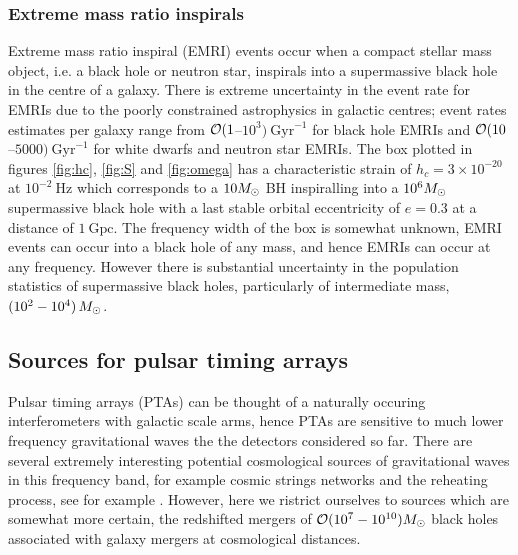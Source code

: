 \subsubsection{Extreme mass ratio inspirals}
Extreme mass ratio inspiral (EMRI) events occur when a compact stellar mass object, i.e. a black hole or neutron star, inspirals into a supermassive black hole in the centre of a galaxy. There is extreme uncertainty in the event rate for EMRIs due to the poorly constrained astrophysics in galactic centres; event rates estimates per galaxy range from ${\cal{O}}(1$--$10^{3})~\textrm{Gyr}^{-1}$ for black hole EMRIs and ${\cal{O}}(10$--$5000)~\textrm{Gyr}^{-1}$ for white dwarfs and neutron star EMRIs. The box plotted in figures \ref{fig:hc}, \ref{fig:S} and \ref{fig:omega} has a characteristic strain of $h_{c}=3\times 10^{-20}$ at $10^{-2}~\textrm{Hz}$ which corresponds to a $10M_{ \odot }$ BH inspiralling into a $10^{6}M_{ \odot }$ supermassive black hole with a last stable orbital eccentricity of $e=0.3$ at a distance of $1~\textrm{Gpc}$. The frequency width of the box is somewhat unknown, EMRI events can occur into a black hole of any mass, and hence EMRIs can occur at any frequency. However there is substantial uncertainty in the population statistics of supermassive black holes, particularly of intermediate mass, $(10^{2}-10^{4})\,M_{ \odot }$.

\subsection{Sources for pulsar timing arrays}
Pulsar timing arrays (PTAs) can be thought of a naturally occuring interferometers with galactic scale arms, hence PTAs are sensitive to much lower frequency gravitational waves the the detectors considered so far. There are several extremely interesting potential cosmological sources of gravitational waves in this frequency band, for example cosmic strings networks and the reheating process, see for example \cite{Haasteren}. However, here we ristrict ourselves to sources which are somewhat more certain, the redshifted mergers of ${\cal{O}}(10^{7}-10^{10})M_{ \odot }$ black holes associated with galaxy mergers at cosmological distances.

